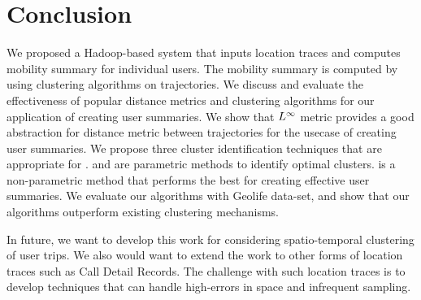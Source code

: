 \section{Conclusion}
\label{sec:conc}
We proposed a Hadoop-based \trajSummary system that inputs location traces and computes mobility summary for individual users. The mobility summary is computed by using clustering algorithms on trajectories. We discuss and evaluate the effectiveness of popular distance metrics and clustering algorithms for our application of creating user summaries. We show that $L^\infty$ metric provides a good abstraction for distance metric between trajectories for the usecase of creating user summaries. We propose three cluster identification techniques that are appropriate for \trajSummary. \thresh and \lthAware are parametric methods to identify optimal clusters. \modal is a non-parametric method that performs the best for creating effective user summaries. We evaluate our algorithms with Geolife data-set, and show that our algorithms outperform existing clustering mechanisms. 

In future, we want to develop this work for considering spatio-temporal clustering of user trips. We also would want to extend the work to other forms of location traces such as Call Detail Records. The challenge with such location traces is to develop techniques that can handle high-errors in space and infrequent sampling.